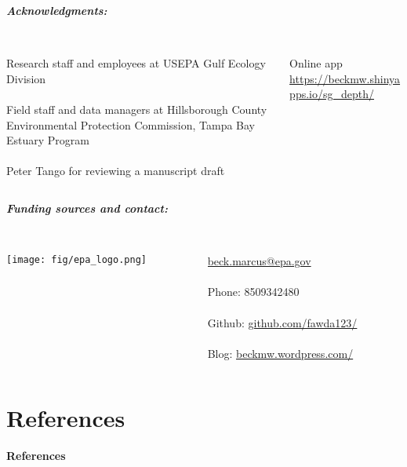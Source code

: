 \documentclass[serif]{beamer}\usepackage[]{graphicx}\usepackage[]{color}
\newcommand{\emtxt}[1]{\textbf{\textit{{\color{mypal4} #1}}}}
\begin{document}
\begin{frame}
\emtxt{Acknowledgments:}\\~\\
\begin{columns}
\begin{column}{0.55\textwidth}
{\footnotesize
Research staff and employees at USEPA Gulf Ecology Division \\~\\
Field staff and data managers at Hillsborough County Environmental Protection Commission, Tampa Bay Estuary Program\\~\\
Peter Tango for reviewing a manuscript draft
}
\end{column}
\begin{column}{0.4\textwidth}
\vspace{-0.2in}
\begin{center}
{\tiny
Online app \href{https://beckmw.shinyapps.io/sg_depth/}{https://beckmw.shinyapps.io/sg\_depth/}\\~\\
}
\centerline{}
\end{center}
\end{column}
\end{columns}
\vfill
\emtxt{Funding sources and contact:}\\~\\
\begin{columns}
\begin{column}{0.5\textwidth}
\centerline{\texttt{[image: fig/epa\_logo.png]}}
\end{column}
\begin{column}{0.5\textwidth}
\scriptsize
\href{mailto:beck.marcus@epa.gov}{beck.marcus@epa.gov} \\~\\
Phone: 8509342480 \\~\\
Github: \href{https://github.com/fawda123/}{github.com/fawda123/} \\~\\
Blog: \href{http://beckmw.wordpress.com/}{beckmw.wordpress.com/}
\end{column}
\end{columns}
\vspace{0.2in}
\end{frame}

\section{References}
\begin{frame}[t]{\textbf{References}}
\tiny
{}


\end{frame}
\end{document}

